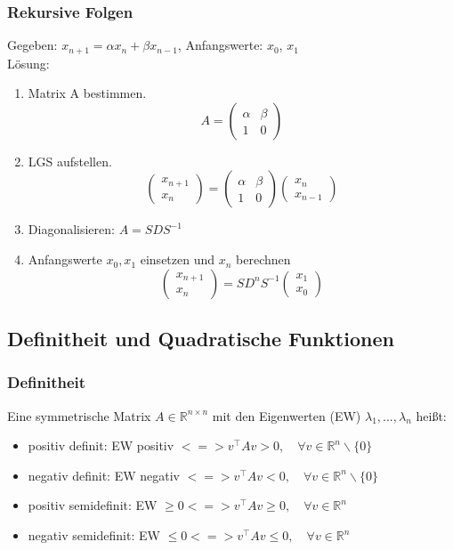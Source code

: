 \documentclass[6pt,a4paper]{scrartcl}
\begin{document}
\begin{multicols*}{4}
\subsubsection{Rekursive Folgen}
Gegeben: $x_{n+1} = {\alpha} x_n + {\beta} x_{n-1}$, Anfangswerte: $x_0$, $x_1$\\
Lösung:\\
\begin{enumerate}
	\item Matrix A bestimmen. 
	\begin{equation*}
	A=\begin{pmatrix}
	{\alpha}&{\beta}\\
	1&0
	\end{pmatrix}
	\end{equation*}
	\item LGS aufstellen.
	\begin{equation*}
	\begin{pmatrix}
	x_{n+1}\\
	x_{n}\end{pmatrix}=\begin{pmatrix}
	{\alpha}&{\beta}\\
	1&0
	\end{pmatrix}
	\begin{pmatrix}
	x_{n}\\
	x_{n-1}\end{pmatrix}
	\end{equation*}
	\item Diagonalisieren: $A=SDS^{-1}$
	\item Anfangswerte $x_0, x_1$ einsetzen und $x_n$ berechnen
	\begin{equation*}
	\begin{pmatrix}
	x_{n+1}\\
	x_{n}\end{pmatrix}=SD^{n}S^{-1}
	\begin{pmatrix}
	x_{1}\\
	x_{0}\end{pmatrix}
	\end{equation*}
\end{enumerate}
\subsection{Definitheit und Quadratische Funktionen}
\subsubsection{Definitheit}
Eine symmetrische Matrix $A \in\mathbb R^{n\times n}$ mit den Eigenwerten (EW) $\lambda_1, ..., \lambda_n$ heißt:
\begin{itemize}\itemsep0pt
\item positiv definit: EW positiv $<=> v^{\top}Av> 0,\quad\forall v \in\mathbb R^n\backslash \{0\}$
\item negativ definit: EW negativ $<=> v^{\top}Av< 0,\quad\forall v \in\mathbb R^n\backslash \{0\}$
\item positiv semidefinit: EW $\geq 0 <=> v^{\top}Av\geq 0,\quad\forall v \in\mathbb R^n$
\item negativ semidefinit: EW $\leq 0 <=> v^{\top}Av\leq 0,\quad\forall v \in\mathbb R^n$
\end{itemize}

\end{multicols*}
\end{document}
